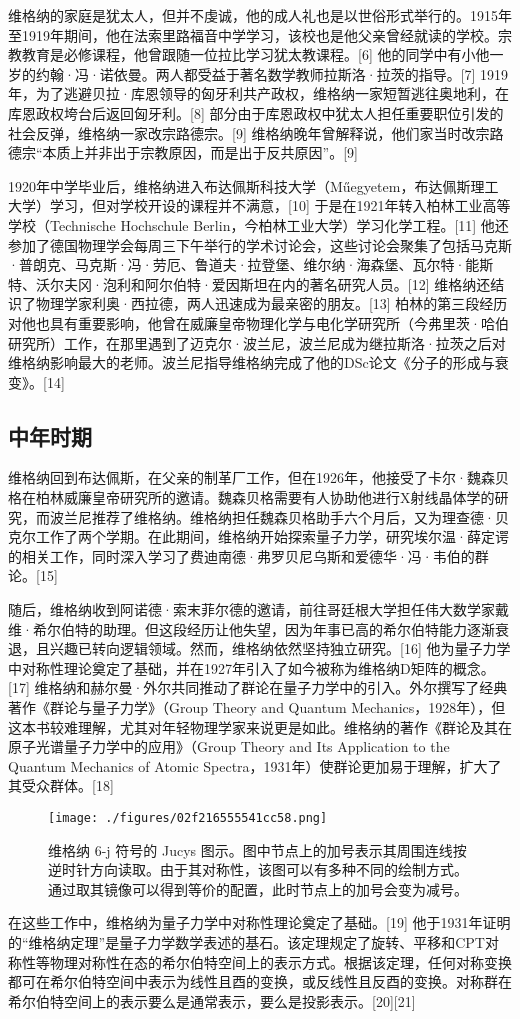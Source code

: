 维格纳的家庭是犹太人，但并不虔诚，他的成人礼也是以世俗形式举行的。1915年至1919年期间，他在法索里路福音中学学习，该校也是他父亲曾经就读的学校。宗教教育是必修课程，他曾跟随一位拉比学习犹太教课程。[6] 他的同学中有小他一岁的约翰·冯·诺依曼。两人都受益于著名数学教师拉斯洛·拉茨的指导。[7] 1919年，为了逃避贝拉·库恩领导的匈牙利共产政权，维格纳一家短暂逃往奥地利，在库恩政权垮台后返回匈牙利。[8] 部分由于库恩政权中犹太人担任重要职位引发的社会反弹，维格纳一家改宗路德宗。[9] 维格纳晚年曾解释说，他们家当时改宗路德宗“本质上并非出于宗教原因，而是出于反共原因”。[9]

1920年中学毕业后，维格纳进入布达佩斯科技大学（Műegyetem，布达佩斯理工大学）学习，但对学校开设的课程并不满意，[10] 于是在1921年转入柏林工业高等学校（Technische Hochschule Berlin，今柏林工业大学）学习化学工程。[11] 他还参加了德国物理学会每周三下午举行的学术讨论会，这些讨论会聚集了包括马克斯·普朗克、马克斯·冯·劳厄、鲁道夫·拉登堡、维尔纳·海森堡、瓦尔特·能斯特、沃尔夫冈·泡利和阿尔伯特·爱因斯坦在内的著名研究人员。[12] 维格纳还结识了物理学家利奥·西拉德，两人迅速成为最亲密的朋友。[13] 柏林的第三段经历对他也具有重要影响，他曾在威廉皇帝物理化学与电化学研究所（今弗里茨·哈伯研究所）工作，在那里遇到了迈克尔·波兰尼，波兰尼成为继拉斯洛·拉茨之后对维格纳影响最大的老师。波兰尼指导维格纳完成了他的DSc论文《分子的形成与衰变》。[14]
\subsection{中年时期}
维格纳回到布达佩斯，在父亲的制革厂工作，但在1926年，他接受了卡尔·魏森贝格在柏林威廉皇帝研究所的邀请。魏森贝格需要有人协助他进行X射线晶体学的研究，而波兰尼推荐了维格纳。维格纳担任魏森贝格助手六个月后，又为理查德·贝克尔工作了两个学期。在此期间，维格纳开始探索量子力学，研究埃尔温·薛定谔的相关工作，同时深入学习了费迪南德·弗罗贝尼乌斯和爱德华·冯·韦伯的群论。[15]

随后，维格纳收到阿诺德·索末菲尔德的邀请，前往哥廷根大学担任伟大数学家戴维·希尔伯特的助理。但这段经历让他失望，因为年事已高的希尔伯特能力逐渐衰退，且兴趣已转向逻辑领域。然而，维格纳依然坚持独立研究。[16] 他为量子力学中对称性理论奠定了基础，并在1927年引入了如今被称为维格纳D矩阵的概念。[17] 维格纳和赫尔曼·外尔共同推动了群论在量子力学中的引入。外尔撰写了经典著作《群论与量子力学》（Group Theory and Quantum Mechanics，1928年），但这本书较难理解，尤其对年轻物理学家来说更是如此。维格纳的著作《群论及其在原子光谱量子力学中的应用》（Group Theory and Its Application to the Quantum Mechanics of Atomic Spectra，1931年）使群论更加易于理解，扩大了其受众群体。[18]
\begin{figure}[ht]
\centering
\texttt{[image: ./figures/02f216555541cc58.png]}
\caption{维格纳 6-j 符号的 Jucys 图示。图中节点上的加号表示其周围连线按逆时针方向读取。由于其对称性，该图可以有多种不同的绘制方式。通过取其镜像可以得到等价的配置，此时节点上的加号会变为减号。} \label{fig_YJwgn_2}
\end{figure}
在这些工作中，维格纳为量子力学中对称性理论奠定了基础。[19] 他于1931年证明的“维格纳定理”是量子力学数学表述的基石。该定理规定了旋转、平移和CPT对称性等物理对称性在态的希尔伯特空间上的表示方式。根据该定理，任何对称变换都可在希尔伯特空间中表示为线性且酉的变换，或反线性且反酉的变换。对称群在希尔伯特空间上的表示要么是通常表示，要么是投影表示。[20][21]


